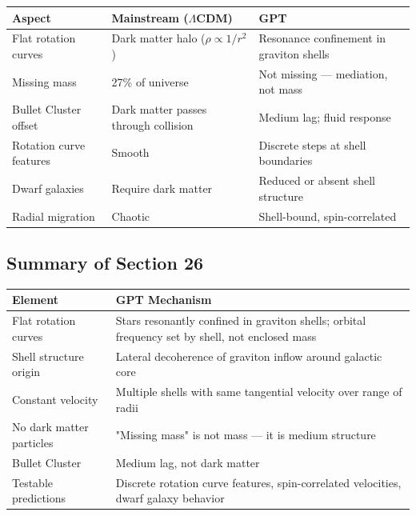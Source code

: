 \documentclass[12pt, a4paper]{article}
\begin{document}
\begin{center}
\begin{tabular}{|p{4cm}|p{5cm}|p{5cm}|}
\hline
\textbf{Aspect} & \textbf{Mainstream (\(\Lambda\)CDM)} & \textbf{GPT} \\
\hline
Flat rotation curves & Dark matter halo (\( \rho \propto 1/r^2 \)) & Resonance confinement in graviton shells \\
\hline
Missing mass & 27\% of universe & Not missing — mediation, not mass \\
\hline
Bullet Cluster offset & Dark matter passes through collision & Medium lag; fluid response \\
\hline
Rotation curve features & Smooth & Discrete steps at shell boundaries \\
\hline
Dwarf galaxies & Require dark matter & Reduced or absent shell structure \\
\hline
Radial migration & Chaotic & Shell-bound, spin-correlated \\
\hline
\end{tabular}
\end{center}

\subsection{Summary of Section 26}
\label{subsec:summary_26}

\begin{center}
\begin{tabular}{|p{4cm}|p{10cm}|}
\hline
\textbf{Element} & \textbf{GPT Mechanism} \\
\hline
Flat rotation curves & Stars resonantly confined in graviton shells; orbital frequency set by shell, not enclosed mass \\
\hline
Shell structure origin & Lateral decoherence of graviton inflow around galactic core \\
\hline
Constant velocity & Multiple shells with same tangential velocity over range of radii \\
\hline
No dark matter particles & "Missing mass" is not mass — it is medium structure \\
\hline
Bullet Cluster & Medium lag, not dark matter \\
\hline
Testable predictions & Discrete rotation curve features, spin-correlated velocities, dwarf galaxy behavior \\
\hline
\end{tabular}
\end{center}
\end{document}
